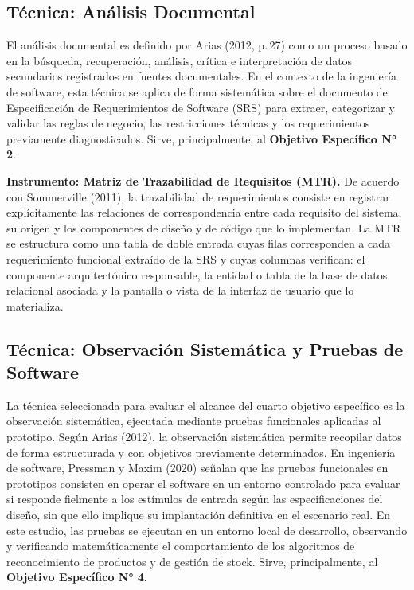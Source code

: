 \documentclass[12pt, letterpaper]{report}
\begin{document}
\subsection{Técnica: Análisis Documental}

El análisis documental es definido por Arias (2012, p.\,27) como un
proceso basado en la búsqueda, recuperación, análisis, crítica e
interpretación de datos secundarios registrados en fuentes
documentales. En el contexto de la ingeniería de software, esta técnica
se aplica de forma sistemática sobre el documento de Especificación de
Requerimientos de Software (SRS) para extraer, categorizar y validar las
reglas de negocio, las restricciones técnicas y los requerimientos
previamente diagnosticados. Sirve, principalmente, al \textbf{Objetivo
Específico N° 2}.

\noindent\textbf{Instrumento: Matriz de Trazabilidad de Requisitos
(MTR).} De acuerdo con Sommerville (2011), la trazabilidad de
requerimientos consiste en registrar explícitamente las relaciones de
correspondencia entre cada requisito del sistema, su origen y los
componentes de diseño y de código que lo implementan. La MTR se
estructura como una tabla de doble entrada cuyas filas corresponden a
cada requerimiento funcional extraído de la SRS y cuyas columnas
verifican: el componente arquitectónico responsable, la entidad o tabla
de la base de datos relacional asociada y la pantalla o vista de la
interfaz de usuario que lo materializa.

\subsection{Técnica: Observación Sistemática y Pruebas de Software}

La técnica seleccionada para evaluar el alcance del cuarto objetivo
específico es la observación sistemática, ejecutada mediante pruebas
funcionales aplicadas al prototipo. Según Arias (2012), la observación
sistemática permite recopilar datos de forma estructurada y con
objetivos previamente determinados. En ingeniería de software,
Pressman y Maxim (2020) señalan que las pruebas funcionales en
prototipos consisten en operar el software en un entorno controlado
para evaluar si responde fielmente a los estímulos de entrada según las
especificaciones del diseño, sin que ello implique su implantación
definitiva en el escenario real. En este estudio, las pruebas se
ejecutan en un entorno local de desarrollo, observando y verificando
matemáticamente el comportamiento de los algoritmos de reconocimiento de
productos y de gestión de stock. Sirve, principalmente, al
\textbf{Objetivo Específico N° 4}.
\end{document}
